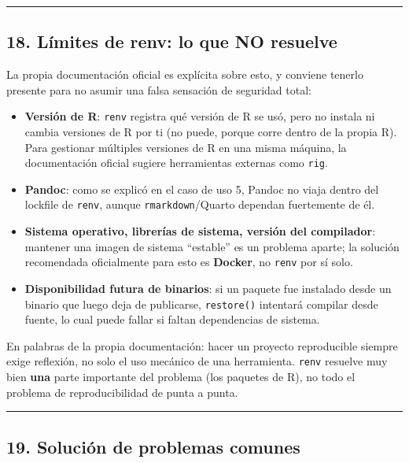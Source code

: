 \documentclass[
  man,
  floatsintext,
  longtable,
  a4paper,
  nolmodern,
  notxfonts,
  notimes,
  12pt,
  colorlinks=true,linkcolor=blue,citecolor=blue,urlcolor=blue]{apa7}
\providecommand{\tightlist}{%
  \setlength{\itemsep}{0pt}\setlength{\parskip}{0pt}}
\begin{document}
\begin{center}\rule{0.5\linewidth}{0.5pt}\end{center}

\subsection{18. Límites de renv: lo que NO
resuelve}\label{luxedmites-de-renv-lo-que-no-resuelve}

La propia documentación oficial es explícita sobre esto, y conviene
tenerlo presente para no asumir una falsa sensación de seguridad total:

\begin{itemize}
\tightlist
\item
  \textbf{Versión de R}: \texttt{renv} registra qué versión de R se usó,
  pero no instala ni cambia versiones de R por ti (no puede, porque
  corre dentro de la propia R). Para gestionar múltiples versiones de R
  en una misma máquina, la documentación oficial sugiere herramientas
  externas como \texttt{rig}.
\item
  \textbf{Pandoc}: como se explicó en el caso de uso 5, Pandoc no viaja
  dentro del lockfile de \texttt{renv}, aunque \texttt{rmarkdown}/Quarto
  dependan fuertemente de él.
\item
  \textbf{Sistema operativo, librerías de sistema, versión del
  compilador}: mantener una imagen de sistema ``estable'' es un problema
  aparte; la solución recomendada oficialmente para esto es
  \textbf{Docker}, no \texttt{renv} por sí solo.
\item
  \textbf{Disponibilidad futura de binarios}: si un paquete fue
  instalado desde un binario que luego deja de publicarse,
  \texttt{restore()} intentará compilar desde fuente, lo cual puede
  fallar si faltan dependencias de sistema.
\end{itemize}

En palabras de la propia documentación: hacer un proyecto reproducible
siempre exige reflexión, no solo el uso mecánico de una herramienta.
\texttt{renv} resuelve muy bien \textbf{una} parte importante del
problema (los paquetes de R), no todo el problema de reproducibilidad de
punta a punta.

\begin{center}\rule{0.5\linewidth}{0.5pt}\end{center}

\subsection{19. Solución de problemas
comunes}\label{soluciuxf3n-de-problemas-comunes}
\end{document}
